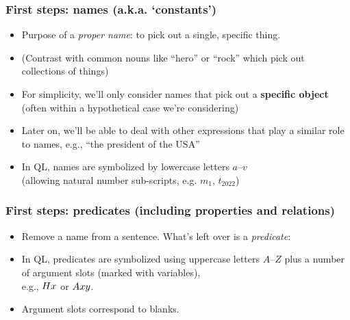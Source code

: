 \begin{frame}
  \frametitle{First steps: names (a.k.a. `constants')}

  \begin{itemize}[<+->]
    \item Purpose of a \emph{proper name}: to pick out a single, specific thing.
    \item (Contrast with common nouns like ``hero'' or ``rock'' which pick out collections of things)
    \item For simplicity, we'll only consider names that pick out a \textbf{specific object} (often within a hypothetical case we're considering)
    \item Later on, we'll be able to deal with other expressions that play a similar role to names, e.g., ``the president of the USA''
    \item In QL, names are symbolized by lowercase letters $a$--$v$ \\ (allowing natural number sub-scripts, e.g. $m_1$, $t_{2022}$)
  \end{itemize}
\end{frame}

\begin{frame}
  \frametitle{First steps: predicates (including properties and relations)}

  \begin{itemize}[<+->]
    \item Remove a name from a sentence. What's left over is a \emph{predicate}:\\
    \item In QL, predicates are symbolized using uppercase letters
    $A$--$Z$ plus a number of argument slots (marked with variables), \\
    e.g., $Hx$ or $Axy$.
    \item Argument slots correspond to blanks.
  \end{itemize}
\end{frame}

